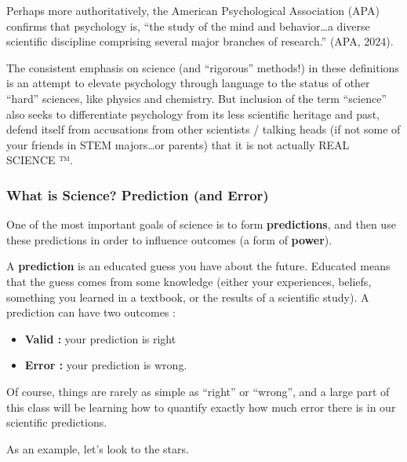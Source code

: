 \documentclass[
  letterpaper,
  DIV=11,
  numbers=noendperiod,
  oneside]{scrreprt}
\begin{document}
Perhaps more authoritatively, the American Psychological Association
(APA) confirms that psychology is, ``the study of the mind and
behavior\ldots a diverse scientific discipline comprising several major
branches of research.'' (APA, 2024).

The consistent emphasis on science (and ``rigorous'' methods!) in these
definitions is an attempt to elevate psychology through language to the
status of other ``hard'' sciences, like physics and chemistry. But
inclusion of the term ``science'' also seeks to differentiate psychology
from its less scientific heritage and past, defend itself from
accusations from other scientists / talking heads (if not some of your
friends in STEM majors\ldots or parents) that it is not actually REAL
SCIENCE ™.~

\subsubsection{What is Science? Prediction (and
Error)}\label{what-is-science-prediction-and-error}

One of the most important goals of science is to form
\textbf{predictions}, and then use these predictions in order to
influence outcomes (a form of \textbf{power}).

A \textbf{prediction} is an educated guess you have about the future.
Educated means that the guess comes from some knowledge (either your
experiences, beliefs, something you learned in a textbook, or the
results of a scientific study). A prediction can have two outcomes :

\begin{itemize}
\item
  \textbf{Valid :} your prediction is right
\item
  \textbf{Error :} your prediction is wrong.
\end{itemize}

Of course, things are rarely as simple as ``right'' or ``wrong'', and a
large part of this class will be learning how to quantify exactly how
much error there is in our scientific predictions.

As an example, let's look to the stars.
\end{document}
